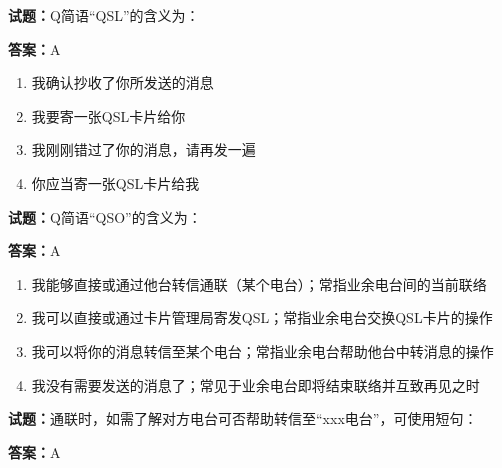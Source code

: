 \documentclass{ctexbook}
\begin{document}




\vspace{1em}

\textbf{试题：}Q简语“QSL”的含义为： 

\textbf{答案：}A 

\begin{enumerate}[leftmargin=3em]
  \item 我确认抄收了你所发送的消息 

  \item 我要寄一张QSL卡片给你 

  \item 我刚刚错过了你的消息，请再发一遍 

  \item 你应当寄一张QSL卡片给我 

\end{enumerate}





\vspace{1em}

\textbf{试题：}Q简语“QSO”的含义为： 

\textbf{答案：}A 

\begin{enumerate}[leftmargin=3em]
  \item 我能够直接或通过他台转信通联（某个电台）；常指业余电台间的当前联络 

  \item 我可以直接或通过卡片管理局寄发QSL；常指业余电台交换QSL卡片的操作 

  \item 我可以将你的消息转信至某个电台；常指业余电台帮助他台中转消息的操作 

  \item 我没有需要发送的消息了；常见于业余电台即将结束联络并互致再见之时 


\end{enumerate}





\vspace{1em}

\textbf{试题：}通联时，如需了解对方电台可否帮助转信至“xxx电台”，可使用短句： 

\textbf{答案：}A 
\end{document}
